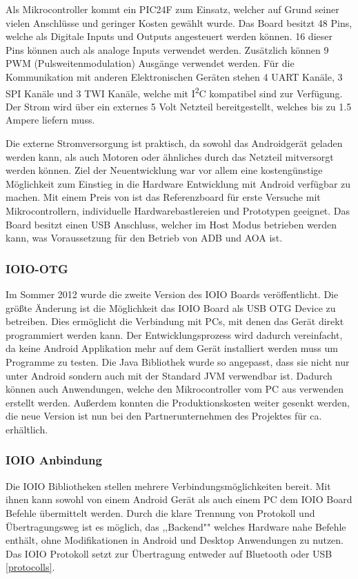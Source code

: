 \documentclass[12pt,journal,compsoc]{IEEEtran}
\begin{document}
Als Mikrocontroller kommt ein PIC24F zum Einsatz, welcher auf Grund seiner vielen Anschlüsse und geringer Kosten gewählt wurde.
Das Board besitzt 48 Pins, welche als Digitale Inputs und Outputs angesteuert werden können. 16 dieser Pins können auch als analoge Inputs verwendet werden.
Zusätzlich können 9 PWM (Pulsweitenmodulation) Ausgänge verwendet werden.
Für die Kommunikation mit anderen Elektronischen Geräten stehen 4 UART Kanäle, 3 SPI Kanäle und 3 TWI Kanäle, welche mit I\textsuperscript{2}C kompatibel sind zur Verfügung.
Der Strom wird über ein externes 5 Volt Netzteil bereitgestellt, welches bis zu 1.5 Ampere liefern muss.

Die externe Stromversorgung ist praktisch, da sowohl das Androidgerät geladen werden kann, als auch Motoren oder ähnliches durch das Netzteil mitversorgt werden können.
Ziel der Neuentwicklung war vor allem eine kostengünstige Möglichkeit zum Einstieg in die Hardware Entwicklung mit Android verfügbar zu machen.
Mit einem Preis von  ist das Referenzboard für erste Versuche mit Mikrocontrollern, individuelle Hardwarebastlereien und Prototypen geeignet.
Das Board besitzt einen USB Anschluss, welcher im Host Modus betrieben werden kann, was Voraussetzung für den Betrieb von ADB und AOA ist.

\subsubsection{IOIO-OTG}
Im Sommer 2012 wurde die zweite Version des IOIO Boards veröffentlicht.
Die größte Änderung ist die Möglichkeit das IOIO Board als USB OTG Device zu betreiben.
Dies ermöglicht die Verbindung mit PCs, mit denen das Gerät direkt programmiert werden kann.
Der Entwicklungsprozess wird dadurch vereinfacht, da keine Android Applikation mehr auf dem Gerät installiert werden muss um Programme zu testen.
Die Java Bibliothek wurde so angepasst, dass sie nicht nur unter Android sondern auch mit der Standard JVM verwendbar ist. 
Dadurch können auch Anwendungen, welche den Mikrocontroller vom PC aus verwenden erstellt werden.
Außerdem konnten die Produktionskosten weiter gesenkt werden, die neue Version ist nun bei den Partnerunternehmen des Projektes für ca.  erhältlich.

\subsubsection{IOIO Anbindung}
Die IOIO Bibliotheken stellen mehrere Verbindungsmöglichkeiten bereit. Mit ihnen kann sowohl von einem Android Gerät als auch einem PC dem IOIO Board Befehle übermittelt werden.
Durch die klare Trennung von Protokoll und Übertragungsweg ist es möglich, das ,,Backend"" welches Hardware nahe Befehle enthält, ohne Modifikationen in Android und Desktop Anwendungen zu nutzen.
Das IOIO Protokoll setzt zur Übertragung entweder auf Bluetooth oder USB \ref{protocolls}.
\end{document}
